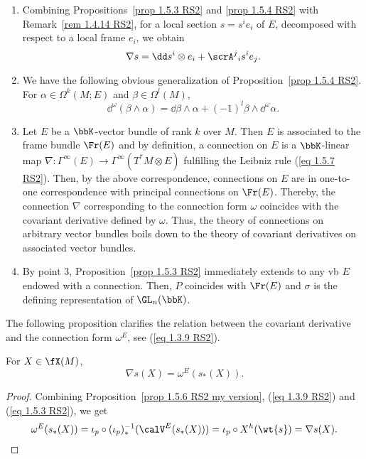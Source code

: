 \begin{rem}\label{rem 1.5.5 RS2}
    \begin{enumerate}
        \item Combining Propositions~\ref{prop 1.5.3 RS2} and \ref{prop 1.5.4 RS2} with Remark~\ref{rem 1.4.14 RS2}, for a local section $s=s^ie_i$ of $E$, decomposed with respect to a local frame $e_i$, we obtain
        \[\nabla s=\dd s^i\otimes e_i+\scrA^j{}_i s^i e_j.\label{eq 1.5.8 RS2}\]
        \item We have the following obvious generalization of Proposition~\ref{prop 1.5.4 RS2}. For $\alpha\in\Omega^k(M;E)$ and $\beta\in\Omega^l(M)$,
        \[\dd^\omega(\beta\wedge\alpha)=\dd\beta\wedge\alpha+(-1)^l\beta\wedge\dd^\omega \alpha.\]
        \item Let $E$ be a $\bbK$-vector bundle of rank $k$ over $M$. Then $E$ is associated to the frame bundle $\Fr(E)$ and by definition, a connection on $E$ is a $\bbK$-linear map $\nabla:\Gamma^\infty(E)\to \Gamma^\infty(T^\ast M\otimes E)$ fulfilling the Leibniz rule (\ref{eq 1.5.7 RS2}). Then, by the above correspondence, connections on $E$ are in one-to-one correspondence with principal connections on $\Fr(E)$. Thereby, the connection $\nabla$ corresponding to the connection form $\omega$ coincides with the covariant derivative defined by $\omega$. Thus, the theory of connections on arbitrary vector bundles boils down to the theory of covariant derivatives on associated vector bundles.
        \item By point 3, Proposition~\ref{prop 1.5.3 RS2} immediately extends to any \gls{vb} $E$ endowed with a connection. Then, $P$ coincides with $\Fr(E)$ and $\sigma$ is the defining representation of $\GL_n(\bbK)$.
    \end{enumerate}
\end{rem}

The following proposition clarifies the relation between the covariant derivative and the connection form $\omega^E$, see (\ref{eq 1.3.9 RS2}).

\begin{prop}[{{\cite[Prop.~1.5.6]{RS2}}}]\label{prop 1.5.6 RS2}
    For $X\in\fX(M)$,
    \[\nabla s(X)=\omega^E(s_\ast(X)).\]
\end{prop}
\begin{proof}
    Combining Proposition~\ref{prop 1.5.6 RS2 my version}, (\ref{eq 1.3.9 RS2}) and (\ref{eq 1.5.3 RS2}), we get
    \[\omega^E(s_\ast(X))=\iota_p\circ (\iota_p)_\ast^{-1}(\calV^E(s_\ast(X)))=\iota_p\circ X^h(\wt{s})=\nabla s(X).\]
\end{proof}


